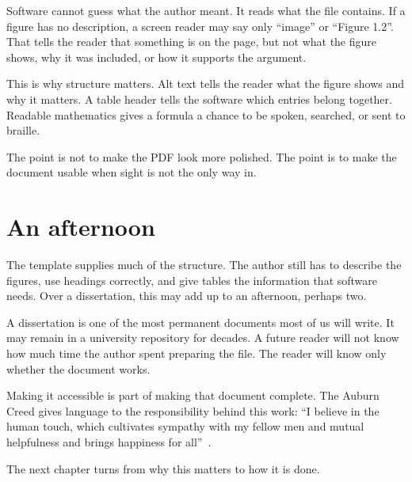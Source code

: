 Software cannot guess what the author meant. It reads what the file
contains. If a figure has no description, a screen reader may say only
\enquote{image} or \enquote{Figure 1.2}. That tells the reader that
something is on the page, but not what the figure shows, why it was
included, or how it supports the argument.

This is why structure matters. Alt text tells the reader what the figure shows and why it matters.
 A table header tells the software which entries belong together. Readable mathematics gives a
formula a chance to be spoken, searched, or sent to braille.

The point is not to make the PDF look more polished. The point is to
make the document usable when sight is not the only way in.

\section{An afternoon}
\label{sec:afternoon}

The template supplies much of the structure. The author still has to
describe the figures, use headings correctly, and give tables the
information that software needs. Over a dissertation, this may add up
to an afternoon, perhaps two.

A dissertation is one of the most permanent documents most of us will
write. It may remain in a university repository for decades. A future
reader will not know how much time the author spent preparing the file.
The reader will know only whether the document works.

Making it accessible is part of making that document complete. The
Auburn Creed gives language to the responsibility behind this work:
\enquote{I believe in the human touch, which cultivates sympathy with
my fellow men and mutual helpfulness and brings happiness for
all}~\autocite{auburncreed}.

The next chapter turns from why this matters to how it is done.
